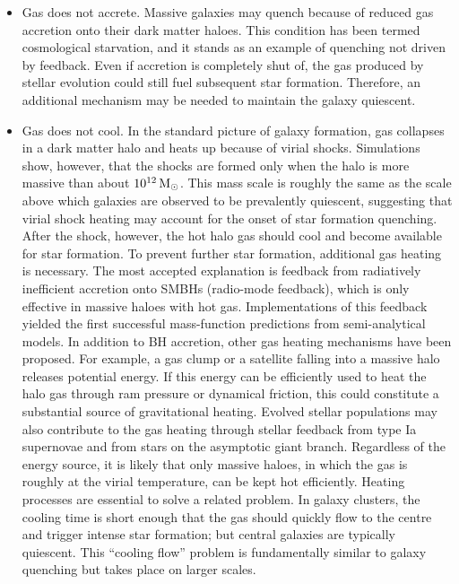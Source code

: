 \documentclass[a4paper,11pt]{article}
\begin{document}
\begin{itemize}
    \item Gas does not accrete. Massive galaxies may quench because of reduced gas accretion onto their dark matter haloes. This condition has been termed cosmological starvation, and it stands as an example of quenching not driven by feedback. Even if accretion is completely shut of, the gas produced by stellar evolution could still fuel subsequent star formation. Therefore, an additional mechanism may be needed to maintain the galaxy quiescent.
    \item Gas does not cool. In the standard picture of galaxy formation, gas collapses in a dark matter halo and heats up because of virial shocks. Simulations show, however, that the shocks are formed only when the halo is more massive than about $10^{12}\,{\rm M_\odot}$. This mass scale is roughly the same as the scale above which galaxies are observed to be prevalently quiescent, suggesting that virial shock heating may account for the onset of star formation quenching. After the shock, however, the hot halo gas should cool and become available for star formation. To prevent further star formation, additional gas heating is necessary. The most accepted explanation is feedback from radiatively inefficient accretion onto SMBHs (radio-mode feedback), which is only effective in massive haloes with hot gas. Implementations of this feedback yielded the first successful mass-function predictions from semi-analytical models. In addition to BH accretion, other gas heating mechanisms have been proposed. For example, a gas clump or a satellite falling into a massive halo releases potential energy. If this energy can be efficiently used to heat the halo gas through ram pressure or dynamical friction, this could constitute a substantial source of gravitational heating. Evolved stellar populations may also contribute to the gas heating through stellar feedback from type Ia supernovae and from stars on the asymptotic giant branch. Regardless of the energy source, it is likely that only massive haloes, in which the gas is roughly at the virial temperature, can be kept hot efficiently. Heating processes are essential to solve a related problem. In galaxy clusters, the cooling time is short enough that the gas should quickly flow to the centre and trigger intense star formation; but central galaxies are typically quiescent. This ``cooling flow'' problem is fundamentally similar to galaxy quenching but takes place on larger scales.

\end{itemize}
\end{document}
